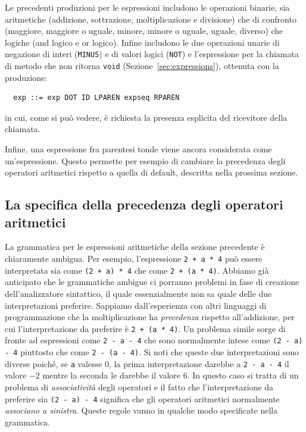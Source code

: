 Le precedenti produzioni per le espressioni includono le operazioni
binarie, sia aritmetiche (addizione, sottrazione, moltiplicazione e
divisione) che di confronto (maggiore, maggiore o uguale, minore, minore
o uguale, uguale, diverso) che logiche (and logico e or logico).
Infine includono le due operazioni unarie di negazione di interi
(\texttt{MINUS}) e di valori logici (\texttt{NOT}) e l'espressione
per la chiamata di metodo che non ritorna \texttt{void}
(Sezione~\ref{sec:expressions}), ottenuta con la produzione:
%
\begin{verbatim}
  exp ::= exp DOT ID LPAREN expseq RPAREN
\end{verbatim}
%
in cui, come si pu\`o vedere, \`e richiesta la presenza esplicita
del ricevitore della chiamata.

Infine, una espressione fra parentesi tonde viene ancora considerata
come un'espressione. Questo permette per esempio
di cambiare la precedenza degli operatori aritmetici rispetto a quella
di default, descritta nella prossima sezione.
%
\subsection{La specifica della precedenza degli operatori aritmetici}
  \label{subsec:priorities}
%
La grammatica per le espressioni aritmetiche della sezione precedente
\`e chiaramente ambigua. Per esempio, l'espressione
\texttt{2 + a * 4} pu\`o essere interpretata sia come
\texttt{(2 + a) * 4} che come \texttt{2 + (a * 4)}. Abbiamo gi\`a anticipato
che le grammatiche ambigue ci porranno problemi in fase di creazione
dell'analizzatore sintattico, il quale essenzialmente non sa quale delle
due interpretazioni preferire. Sappiamo dall'esperienza con altri linguaggi
di programmazione che la moltiplicazione ha \emph{precedenza} rispetto
all'addizione, per cui l'interpretazione da preferire \`e
\texttt{2 + (a * 4)}. Un problema simile sorge di fronte ad espressioni come
\texttt{2 - a - 4} che sono normalmente intese come
\texttt{(2 - a) - 4} piuttosto che come \texttt{2 - (a - 4)}. Si noti che
queste due interpretazioni sono diverse poich\'e, se \texttt{a} valesse
$0$, la prima interpretazione darebbe a
\texttt{2 - a - 4} il valore $-2$ mentre la seconda le darebbe il valore $6$.
In questo caso si tratta di un problema di \emph{associativit\`a}
degli operatori e il fatto che l'interpretazione da preferire sia
\texttt{(2 - a) - 4} significa che gli operatori aritmetici normalmente
\emph{associano a sinistra}.
Queste regole vanno in qualche modo specificate nella grammatica.

